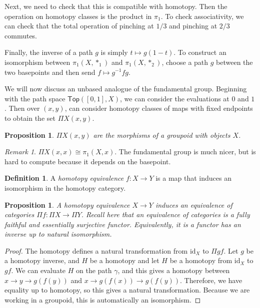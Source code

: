 \documentclass[leqno, openany]{memoir}
\newtheorem{prop}[thm]{Proposition}
\theoremstyle{definition}
\newtheorem{defn}[thm]{Definition}
\theoremstyle{remark}
\newtheorem{rmk}[thm]{Remark}
\theoremstyle{plain}
\theoremstyle{definition}
\theoremstyle{remark}
\newcommand{\mr}[1]{\mathrm{#1}}
\begin{document}
Next, we need to check that this is compatible with homotopy. Then the operation on homotopy classes is the product in $\pi_1$. To check associativity, we can check that the total operation of pinching at $1/3$ and pinching at $2/3$ commutes.

Finally, the inverse of a path $g$ is simply $t \mapsto g(1-t)$. To construct an isomorphism between $\pi_1(X,*_1)$ and $\pi_1(X, *_2)$, choose a path $g$ between the two basepoints and then send $f \mapsto g^{-1} f g$.

We will now discuss an unbased analogue of the fundamental group. Beginning with the path space $\mathsf{Top}([0,1],X)$, we can consider the evaluations at $0$ and $1$. Then over $(x,y)$, can consider homotopy classes of maps with fixed endpoints to obtain the set $\Pi X(x,y)$.

\begin{prop}
    $\Pi X(x,y)$ are the morphisms of a \textit{groupoid} with objects $X$.
\end{prop}

\begin{rmk}
    $\Pi X(x,x) \cong \pi_1(X,x)$. The fundamental group is much nicer, but is hard to compute because it depends on the basepoint.
\end{rmk}

\begin{defn}
    A \textit{homotopy equivalence} $f:X \to Y$ is a map that induces an isomorphism in the homotopy category. 
\end{defn}

\begin{prop}
    A homotopy equivalence $X \to Y$ induces an equivalence of categories $\Pi f: \Pi X \to \Pi Y$. Recall here that an equivalence of categories is a fully faithful and essentially surjective functor. Equivalently, it is a functor has an inverse up to natural isomorphism.
\end{prop}

\begin{proof}
    The homotopy defines a natural transformation from $\mr{id}_X$ to $\Pi gf$. Let $g$ be a homotopy inverse, and $H$ be a homotopy and let $H$ be a homotopy from $\mr{id}_X$ to $gf$. We can evaluate $H$ on the path $\gamma$, and this gives a homotopy between $x \to y \to g(f(y))$ and $x \to g(f(x)) \to g(f(y))$. Therefore, we have equality up to homotopy, so this gives a natural transformation. Because we are working in a groupoid, this is automatically an isomorphism.
\end{proof}
\end{document}
